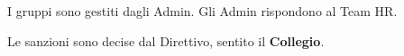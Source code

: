 
\begin{commi}
  \comma[id=com101] I gruppi sono gestiti dagli Admin.
  \comma[id=com102] Gli Admin rispondono al Team HR.
\end{commi}

Le sanzioni sono decise dal Direttivo, sentito il \textbf{Collegio}.
